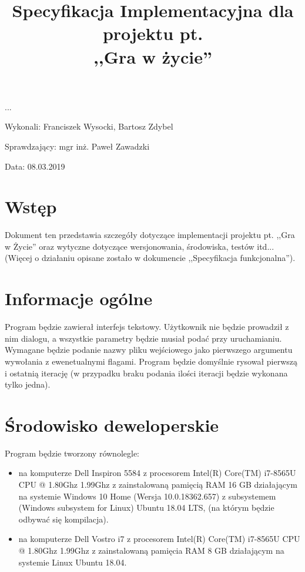 \documentclass{article}
\title{Specyfikacja Implementacyjna dla projektu pt. \\ ,,Gra w życie''}
\author{}
\date{}
\begin{document}
\maketitle

\begin{flushright}
\par ...
\vfill
\par
Wykonali: Franciszek Wysocki, Bartosz Zdybel

Sprawdzający: mgr inż. Paweł Zawadzki

Data: 08.03.2019
\end{flushright}

\thispagestyle{empty}
\newpage

\begin{frame}{}
    \tableofcontents
\end{frame}
\newpage

\section{Wstęp}

Dokument ten przedstawia szczegóły dotyczące implementacji projektu pt. ,,Gra w Życie'' oraz wytyczne dotyczące wersjonowania, środowiska, testów itd... (Więcej o działaniu opisane zostało w dokumencie ,,Specyfikacja funkcjonalna'').

\section{Informacje ogólne}
Program będzie zawierał interfejs tekstowy. Użytkownik nie będzie prowadził z nim dialogu, a wszystkie parametry będzie musiał podać przy uruchamianiu. Wymagane będzie podanie nazwy pliku wejściowego jako pierwszego argumentu wywołania z ewenetualnymi flagami. Program będzie domyślnie rysował pierwszą i ostatnią iterację (w przypadku braku podania ilości iteracji będzie wykonana tylko jedna).





\section{Środowisko deweloperskie}
Program będzie tworzony równolegle:
\begin{itemize}
\item na komputerze Dell Inspiron 5584 z procesorem Intel(R) Core(TM) i7-8565U CPU @ 1.80Ghz 1.99Ghz z zainstalowaną pamięcią RAM 16 GB działającym na systemie Windows 10 Home (Wersja 10.0.18362.657) z subsystemem (Windows subsystem for Linux) Ubuntu 18.04 LTS, (na którym będzie odbywać się kompilacja).
\item na komputerze Dell Vostro i7 z procesorem Intel(R) Core(TM) i7-8565U CPU @ 1.80Ghz 1.99Ghz z zainstalowaną pamięcia RAM 8 GB działającym na systemie Linux Ubuntu 18.04.
\end{itemize}
\end{document}
